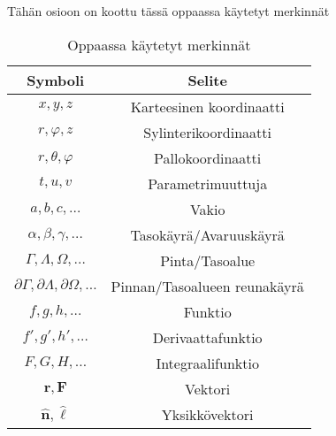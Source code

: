 \documentclass[../integrointiopas.tex]{subfiles}
\begin{document}
	Tähän osioon on koottu tässä oppaassa käytetyt merkinnät 
	
	\begin{table}[h!]
		\centering
		\begin{tabular}{|c|c|}
			\hline
			Symboli & Selite \\
			\hline
			$x, y, z$ & Karteesinen koordinaatti \\
			$r, \varphi, z$ & Sylinterikoordinaatti \\
			$r, \theta, \varphi$ & Pallokoordinaatti\\
			$t, u, v$ & Parametrimuuttuja \\
			$a, b, c, \dots$ & Vakio \\
			\hline
			$\alpha, \beta, \gamma, \dots$ & Tasokäyrä/Avaruuskäyrä \\
			$\Gamma, \Lambda, \Omega, \dots$ & Pinta/Tasoalue \\
			$\partial\Gamma, \partial\Lambda, \partial\Omega, \dots$ & Pinnan/Tasoalueen reunakäyrä \\
			\hline
			$f, g, h, \dots$ & Funktio \\
			$f', g', h', \dots$ & Derivaattafunktio \\
			$F, G, H, \dots$ & Integraalifunktio \\
			\hline
			$\mathbf{r}, \mathbf{F}$ & Vektori \\
			$\mathbf{\hat{n}}, \boldsymbol{\hat{\ell}}$ & Yksikkövektori \\
			\hline
		\end{tabular}
		\caption{Oppaassa käytetyt merkinnät}
		\label{table1}
	\end{table}
\end{document}
